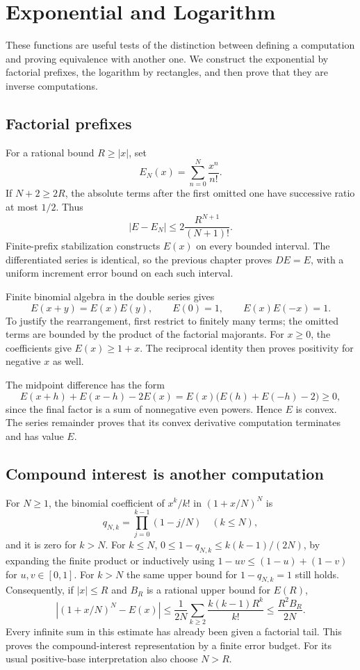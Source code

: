 \chapter{Exponential and Logarithm}\label{ch:exponential-logarithm}

These functions are useful tests of the distinction between defining a
computation and proving equivalence with another one.  We construct the
exponential by factorial prefixes, the logarithm by rectangles, and then
prove that they are inverse computations.

\section{Factorial prefixes}
For a rational bound $R\ge|x|$, set
\[
 E_N(x)=\sum_{n=0}^N\frac{x^n}{n!}.
\]
If $N+2\ge2R$, the absolute terms after the first omitted one have
successive ratio at most $1/2$.  Thus
\[
 |E-E_N|\le2\frac{R^{N+1}}{(N+1)!}.
\]
Finite-prefix stabilization constructs $E(x)$ on every bounded interval.
The differentiated series is identical, so the previous chapter proves
$DE=E$, with a uniform increment error bound on each such interval.

Finite binomial algebra in the double series gives
\[
 E(x+y)=E(x)E(y),\qquad E(0)=1,\qquad E(x)E(-x)=1.
\]
To justify the rearrangement, first restrict to finitely many terms;
the omitted terms are bounded by the product of the factorial majorants.
For $x\ge0$, the coefficients give $E(x)\ge1+x$.  The reciprocal
identity then proves positivity for negative $x$ as well.

The midpoint difference has the form
\[
 E(x+h)+E(x-h)-2E(x)
   =E(x)\bigl(E(h)+E(-h)-2\bigr)\ge0,
\]
since the final factor is a sum of nonnegative even powers.  Hence $E$ is
convex.  The series remainder proves that its convex derivative computation
terminates and has value $E$.

\section{Compound interest is another computation}
For $N\ge1$, the binomial coefficient of $x^k/k!$ in $(1+x/N)^N$ is
\[
 q_{N,k}=\prod_{j=0}^{k-1}(1-j/N)\quad(k\le N),
\]
and it is zero for $k>N$.  For $k\le N$,
$0\le1-q_{N,k}\le k(k-1)/(2N)$, by expanding the finite product or
inductively using $1-uv\le(1-u)+(1-v)$ for $u,v\in[0,1]$.
For $k>N$ the same upper bound for $1-q_{N,k}=1$ still holds.
Consequently, if $|x|\le R$ and $B_R$ is a rational upper bound for $E(R)$,
\[
 \left|(1+x/N)^N-E(x)\right|
 \le\frac1{2N}\sum_{k\ge2}\frac{k(k-1)R^k}{k!}
 \le\frac{R^2B_R}{2N}.
\]
Every infinite sum in this estimate has already been given a factorial
tail.  This proves the compound-interest representation by a finite error
budget.  For its usual positive-base interpretation also choose $N>R$.

